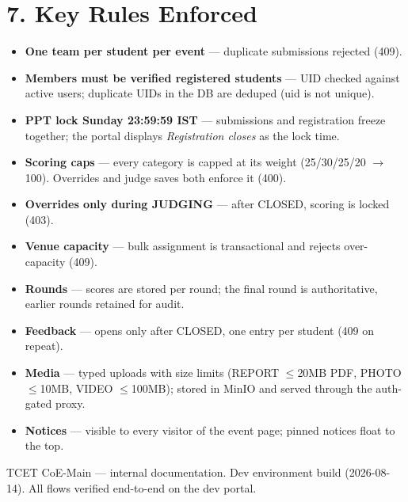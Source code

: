 \documentclass[11pt,a4paper]{article}
\begin{document}
\section*{7. Key Rules Enforced}
\begin{itemize}[leftmargin=6mm, itemsep=1mm]
  \item \textbf{One team per student per event} --- duplicate submissions rejected (409).
  \item \textbf{Members must be verified registered students} --- UID checked against active users; duplicate UIDs in the DB are deduped (uid is not unique).
  \item \textbf{PPT lock Sunday 23:59:59 IST} --- submissions and registration freeze together; the portal displays \emph{Registration closes} as the lock time.
  \item \textbf{Scoring caps} --- every category is capped at its weight (25/30/25/20 $\rightarrow$ 100). Overrides and judge saves both enforce it (400).
  \item \textbf{Overrides only during JUDGING} --- after CLOSED, scoring is locked (403).
  \item \textbf{Venue capacity} --- bulk assignment is transactional and rejects over-capacity (409).
  \item \textbf{Rounds} --- scores are stored per round; the final round is authoritative, earlier rounds retained for audit.
  \item \textbf{Feedback} --- opens only after CLOSED, one entry per student (409 on repeat).
  \item \textbf{Media} --- typed uploads with size limits (REPORT $\le$20MB PDF, PHOTO $\le$10MB, VIDEO $\le$100MB); stored in MinIO and served through the auth-gated proxy.
  \item \textbf{Notices} --- visible to every visitor of the event page; pinned notices float to the top.
\end{itemize}

\vfill
{\footnotesize\color{navy!60} TCET CoE-Main --- internal documentation. Dev environment build (2026-08-14). All flows verified end-to-end on the dev portal.}
\end{document}
